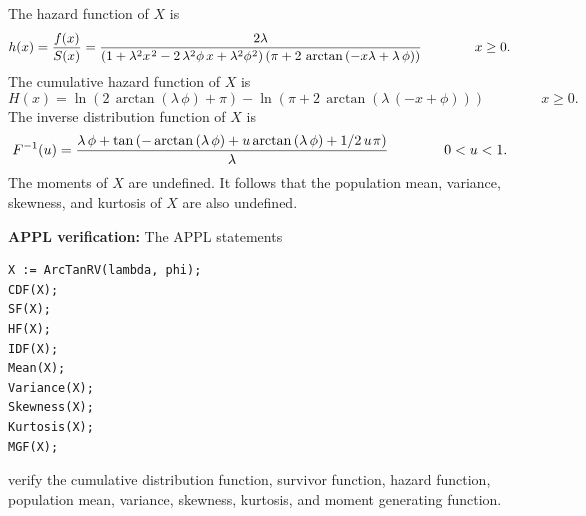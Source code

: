 \documentclass[12pt,fullpage]{article}
\begin{document}
The hazard function of $X$ is
$$
h(x) = \frac{f(x)} {S(x)} = {\frac {2 \lambda } { ( 1 + {\lambda } ^ {2} {x} ^ {\kern 0.08 em 2} - 2 \, {\lambda } ^ {2} \phi \, x + {\lambda } ^ {2} {\phi } ^ {\kern 0.04 em 2})  \left( \pi + 2 \, \arctan \left( -x \lambda + \lambda \, \phi  \right)  \right) }} \qquad \qquad x \geq 0.
$$
The cumulative hazard function of $X$ is
$$
H(x) = \ln  \left( 2 \,\arctan \left( \lambda \, \phi  \right) + \pi  \right) - \ln  \left( \pi + 2 \, \arctan \left( \lambda \, \left( -x + \phi  \right)  \right)  \right)   \qquad \qquad x \geq 0.
$$
The inverse distribution function of $X$ is
$$
F ^ {-1}(u) = {\frac {\lambda \, \phi + \tan \left( -\arctan \left( \lambda \, \phi \right) + u \arctan \left( \lambda \, \phi  \right) + 1 / 2 \, u \kern 0.08 em \pi  \right) } {\lambda}} \qquad \qquad 0 < u < 1.
$$
The moments of $X$ are undefined. It follows that the population mean, variance, skewness, and kurtosis of $X$ are also undefined.

\vspace{0.1in}

\noindent
{\bf APPL verification:}
The APPL statements
\begin{verbatim}
X := ArcTanRV(lambda, phi);
CDF(X);
SF(X);
HF(X);
IDF(X);
Mean(X);
Variance(X);
Skewness(X);
Kurtosis(X);
MGF(X);
\end{verbatim}
verify the cumulative distribution function, survivor function, hazard function, population mean, variance, skewness, kurtosis, and moment generating function.
\end{document}
